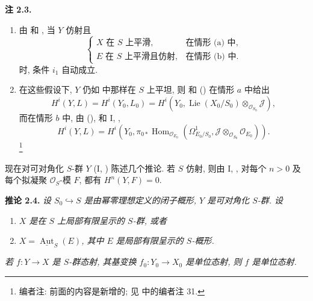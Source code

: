 \medskip
\noindent{}\textbf{注 2.3.}
\begin{enumerate}
\item[(1)] 由  和
  , 当 \(Y\) 仿射且
  \[
   \begin{cases}
    X\text{ 在 }S\text{ 上平滑}, &\text{在情形 (a) 中},\\
    E\text{ 在 }S\text{ 上平滑且仿射}, &\text{在情形 (b) 中}.
   \end{cases}
  \]
  时, 条件 \(i_1\) 自动成立.
\item[(2)] 在这些假设下, \(Y\) 仍如
   中那样在 \(S\) 上平坦,
  则  和
  () 在情形 \(a\) 中给出
  \[
   H^i(Y,L)=H^i(Y_0,L_0)
   =H^i\!\left(Y_0,
    \operatorname{Lie}(X_0/S_0)
    \otimes_{\mathscr O_{S_0}}\mathscr J\right),
  \]
  而在情形 \(b\) 中, 由 (),
   和 I, ,
  \[
   H^i(Y,L)=H^i\!\left(Y_0,
    \pi_{0*}\operatorname{Hom}_{\mathscr O_{E_0}}
    (\Omega^1_{E_0/S_0},
     \mathscr J\otimes_{\mathscr O_{S_0}}\mathscr O_{E_0})\right).
  \]
  \footnote{编者注: 前面的内容是新增的; 见
   中的编者注 31.}
\end{enumerate}

现在对可对角化 \(S\)-群 \(Y\) (I, )
陈述几个推论. 若 \(S\) 仿射, 则由 I, ,
对每个 \(n>0\) 及每个拟凝聚 \(\mathscr O_S\)-模 \(F\),
都有 \(H^n(Y,F)=0\).

\medskip
\noindent{}\textbf{推论 2.4.}
\textit{设 \(S_0\hookrightarrow S\) 是由幂零理想定义的闭子概形,
\(Y\) 是可对角化 \(S\)-群. 设}
\begin{enumerate}
\item[\(a\)] \textit{\(X\) 是在 \(S\) 上局部有限呈示的
  \(S\)-群, 或者}
\item[\(b\)]
  \textit{\(X=\underline{\operatorname{Aut}}_S(E)\), 其中
  \(E\) 是局部有限呈示的 \(S\)-概形.}
\end{enumerate}
\textit{若 \(f:Y\to X\) 是 \(S\)-群态射,
其基变换 \(f_0:Y_0\to X_0\) 是单位态射, 则 \(f\) 是单位态射.}

